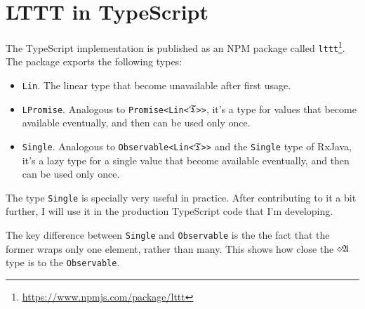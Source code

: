 \section{LTTT in TypeScript}

The TypeScript implementation is published as an NPM package called \texttt{lttt}\footnote{\url{https://www.npmjs.com/package/lttt}}. The package exports the following types:
\begin{itemize}
    \item \texttt{Lin}. The linear type that become unavailable after first usage.
    \item \texttt{LPromise}. Analogous to \texttt{Promise<Lin<}$\mathfrak{T}$\texttt{>{}>}, it's a type for values that become available eventually, and then can be used only once.
    \item \texttt{Single}. Analogous to \texttt{Observable<Lin<}$\mathfrak{T}$\texttt{>{}>} and the \texttt{Single} type of RxJava, it's a lazy type for a single value that become available eventually, and then can be used only once.
\end{itemize}

The type \texttt{Single} is specially very useful in practice. After contributing to it a bit further, I will use it in the production TypeScript code that I'm developing.

The key difference between \texttt{Single} and \texttt{Observable} is the the fact that the former wraps only one element, rather than many. This shows how close the $\diamond\mathfrak{A}$ type is to the \texttt{Observable}.